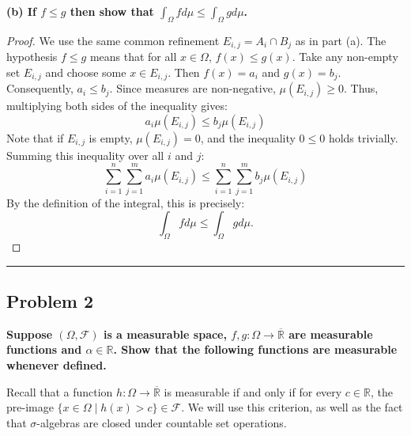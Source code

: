 \documentclass[11pt]{article}
\begin{document}
\vspace{0.5em}
\noindent \textbf{(b) If $f \le g$ then show that $\int_\Omega f d\mu \le \int_\Omega g d\mu$.}

\begin{proof}
We use the same common refinement $E_{i,j} = A_i \cap B_j$ as in part (a).
The hypothesis $f \le g$ means that for all $x \in \Omega$, $f(x) \le g(x)$.
Take any non-empty set $E_{i,j}$ and choose some $x \in E_{i,j}$. Then $f(x) = a_i$ and $g(x) = b_j$. Consequently, $a_i \le b_j$.
Since measures are non-negative, $\mu(E_{i,j}) \ge 0$. Thus, multiplying both sides of the inequality gives:
\[ a_i \mu(E_{i,j}) \le b_j \mu(E_{i,j}) \]
Note that if $E_{i,j}$ is empty, $\mu(E_{i,j}) = 0$, and the inequality $0 \le 0$ holds trivially.
Summing this inequality over all $i$ and $j$:
\[ \sum_{i=1}^{n} \sum_{j=1}^{m} a_i \mu(E_{i,j}) \le \sum_{i=1}^{n} \sum_{j=1}^{m} b_j \mu(E_{i,j}) \]
By the definition of the integral, this is precisely:
\[ \int_\Omega f d\mu \le \int_\Omega g d\mu. \]
\end{proof}

\vspace{1em}
\hrule
\vspace{1em}

\subsection*{Problem 2}
\textbf{Suppose $(\Omega, \mathcal{F})$ is a measurable space, $f, g: \Omega \to \overline{\mathbb{R}}$ are measurable functions and $\alpha \in \mathbb{R}$. Show that the following functions are measurable whenever defined.}

\vspace{0.5em}
Recall that a function $h: \Omega \to \overline{\mathbb{R}}$ is measurable if and only if for every $c \in \mathbb{R}$, the pre-image $\{x \in \Omega \mid h(x) > c\} \in \mathcal{F}$. We will use this criterion, as well as the fact that $\sigma$-algebras are closed under countable set operations.
\end{document}
